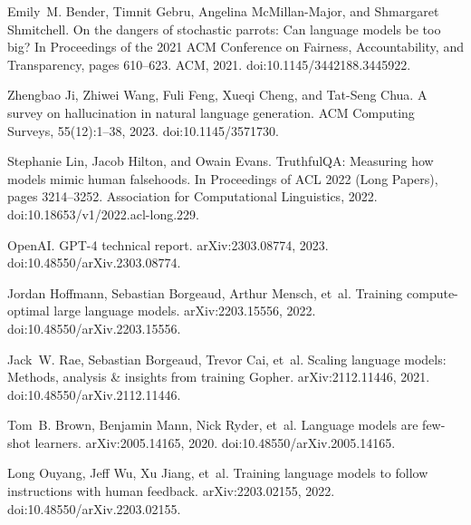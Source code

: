 \documentclass[10pt]{article}
\begin{document}
\begin{thebibliography}{99}

Emily~M. Bender, Timnit Gebru, Angelina McMillan-Major, and Shmargaret
  Shmitchell.
\newblock On the dangers of stochastic parrots: Can language models be too big?
\newblock In Proceedings of the 2021 ACM Conference on Fairness, Accountability, and Transparency, pages 610--623. ACM, 2021.
\newblock doi:10.1145/3442188.3445922.

Zhengbao Ji, Zhiwei Wang, Fuli Feng, Xueqi Cheng, and Tat-Seng Chua.
\newblock A survey on hallucination in natural language generation.
\newblock ACM Computing Surveys, 55(12):1--38, 2023.
\newblock doi:10.1145/3571730.

Stephanie Lin, Jacob Hilton, and Owain Evans.
\newblock TruthfulQA: Measuring how models mimic human falsehoods.
\newblock In Proceedings of ACL 2022 (Long Papers), pages 3214--3252. Association for Computational Linguistics, 2022.
\newblock doi:10.18653/v1/2022.acl-long.229.

OpenAI.
\newblock GPT-4 technical report.
\newblock arXiv:2303.08774, 2023.
\newblock doi:10.48550/arXiv.2303.08774.

Jordan Hoffmann, Sebastian Borgeaud, Arthur Mensch, et~al.
\newblock Training compute-optimal large language models.
\newblock arXiv:2203.15556, 2022.
\newblock doi:10.48550/arXiv.2203.15556.

Jack~W. Rae, Sebastian Borgeaud, Trevor Cai, et~al.
\newblock Scaling language models: Methods, analysis \& insights from training {Gopher}.
\newblock arXiv:2112.11446, 2021.
\newblock doi:10.48550/arXiv.2112.11446.

Tom~B. Brown, Benjamin Mann, Nick Ryder, et~al.
\newblock Language models are few-shot learners.
\newblock arXiv:2005.14165, 2020.
\newblock doi:10.48550/arXiv.2005.14165.

Long Ouyang, Jeff Wu, Xu Jiang, et~al.
\newblock Training language models to follow instructions with human feedback.
\newblock arXiv:2203.02155, 2022.
\newblock doi:10.48550/arXiv.2203.02155.


\end{thebibliography}
\end{document}

